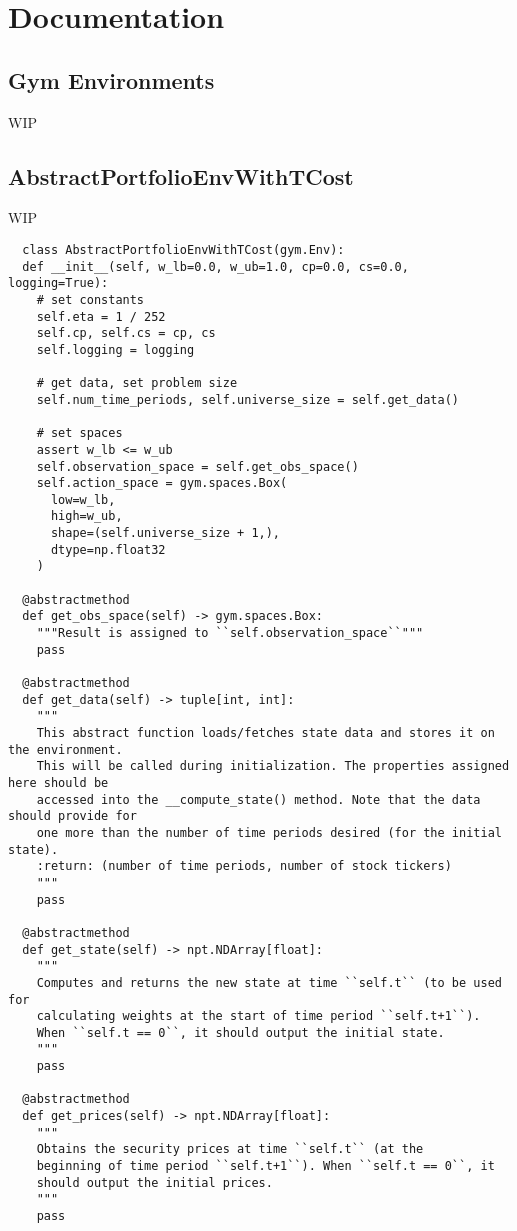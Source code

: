 \chapter{Documentation}

\section{Gym Environments}

WIP

\section{AbstractPortfolioEnvWithTCost}

WIP

\begin{verbatim}
  class AbstractPortfolioEnvWithTCost(gym.Env):
  def __init__(self, w_lb=0.0, w_ub=1.0, cp=0.0, cs=0.0, logging=True):
    # set constants
    self.eta = 1 / 252
    self.cp, self.cs = cp, cs
    self.logging = logging

    # get data, set problem size
    self.num_time_periods, self.universe_size = self.get_data()

    # set spaces
    assert w_lb <= w_ub
    self.observation_space = self.get_obs_space()
    self.action_space = gym.spaces.Box(
      low=w_lb,
      high=w_ub,
      shape=(self.universe_size + 1,),
      dtype=np.float32
    )

  @abstractmethod
  def get_obs_space(self) -> gym.spaces.Box:
    """Result is assigned to ``self.observation_space``"""
    pass

  @abstractmethod
  def get_data(self) -> tuple[int, int]:
    """
    This abstract function loads/fetches state data and stores it on the environment.
    This will be called during initialization. The properties assigned here should be
    accessed into the __compute_state() method. Note that the data should provide for
    one more than the number of time periods desired (for the initial state).
    :return: (number of time periods, number of stock tickers)
    """
    pass

  @abstractmethod
  def get_state(self) -> npt.NDArray[float]:
    """
    Computes and returns the new state at time ``self.t`` (to be used for
    calculating weights at the start of time period ``self.t+1``).
    When ``self.t == 0``, it should output the initial state.
    """
    pass

  @abstractmethod
  def get_prices(self) -> npt.NDArray[float]:
    """
    Obtains the security prices at time ``self.t`` (at the
    beginning of time period ``self.t+1``). When ``self.t == 0``, it
    should output the initial prices.
    """
    pass


\end{verbatim}
